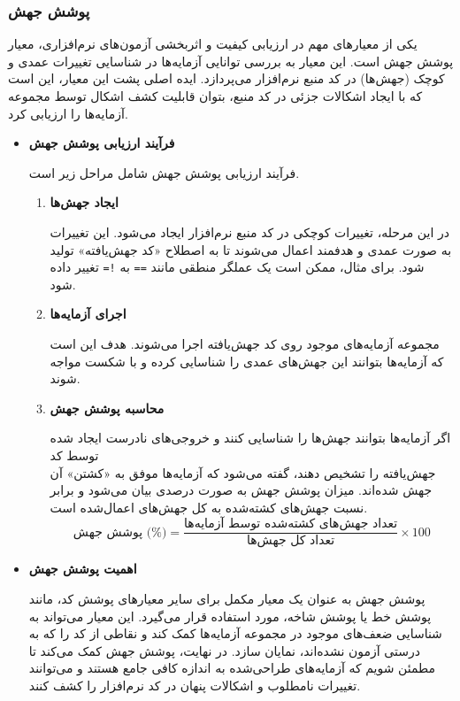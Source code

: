 \subsubsection{پوشش جهش}

یکی از معیارهای مهم در ارزیابی کیفیت و اثربخشی آزمون‌های نرم‌افزاری، معیار پوشش جهش است. این معیار به بررسی توانایی آزمایه‌ها در شناسایی تغییرات عمدی و کوچک (جهش‌ها) در کد منبع نرم‌افزار می‌پردازد. ایده اصلی پشت این معیار، این است که با ایجاد اشکالات جزئی در کد منبع، بتوان قابلیت کشف اشکال توسط مجموعه آزمایه‌ها را ارزیابی کرد.

\begin{itemize}
	\item \textbf{فرآیند ارزیابی پوشش جهش}

فرآیند ارزیابی پوشش جهش شامل مراحل زیر است.

\begin{enumerate}
	\item \textbf{ایجاد جهش‌ها} 
	
	در این مرحله، تغییرات کوچکی در کد منبع نرم‌افزار ایجاد می‌شود. این تغییرات به صورت عمدی و هدفمند اعمال می‌شوند تا به اصطلاح «کد جهش‌یافته» تولید شود. برای مثال، ممکن است یک عملگر منطقی مانند \texttt{==} به \texttt{!=} تغییر داده شود.
	\item \textbf{اجرای آزمایه‌ها}
	
	 مجموعه آزمایه‌های موجود روی کد جهش‌یافته اجرا می‌شوند. هدف این است که آزمایه‌ها بتوانند این جهش‌های عمدی را شناسایی کرده و با شکست مواجه شوند.
	 \newline
	\item \textbf{محاسبه پوشش جهش}
	
	 اگر آزمایه‌ها بتوانند جهش‌ها را شناسایی کنند و خروجی‌های نادرست ایجاد شده توسط کد \\ جهش‌یافته را تشخیص دهند، گفته می‌شود که آزمایه‌ها موفق به «کشتن» آن جهش شده‌اند. میزان پوشش جهش به صورت درصدی بیان می‌شود و برابر نسبت جهش‌های کشته‌شده به کل جهش‌های اعمال‌شده است.
	\[
	\text{پوشش جهش (\%)} = \frac{\text{تعداد جهش‌های کشته‌شده توسط آزمایه‌ها}}{\text{تعداد کل جهش‌ها}} \times 100
	\]
\end{enumerate}

	\item \textbf{اهمیت پوشش جهش}

پوشش جهش به عنوان یک معیار مکمل برای سایر معیارهای پوشش کد، مانند پوشش خط یا پوشش شاخه، مورد استفاده قرار می‌گیرد. این معیار می‌تواند به شناسایی ضعف‌های موجود در مجموعه آزمایه‌ها کمک کند و نقاطی از کد را که به درستی آزمون نشده‌اند، نمایان سازد. در نهایت، پوشش جهش کمک می‌کند تا مطمئن شویم که آزمایه‌های طراحی‌شده به اندازه کافی جامع هستند و می‌توانند تغییرات نامطلوب و اشکالات پنهان در کد نرم‌افزار را کشف کنند.


\end{itemize}
